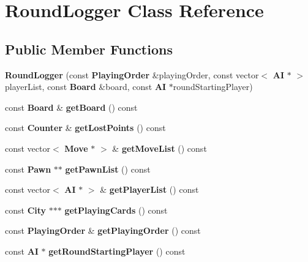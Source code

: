 \section{Round\-Logger Class Reference}
\label{class_round_logger}
\subsection*{Public Member Functions}
\begin{DoxyCompactItemize}
\item 
{\bfseries Round\-Logger} (const {\bf Playing\-Order} \&playing\-Order, const vector$<$ {\bf A\-I} $\ast$ $>$ player\-List, const {\bf Board} \&board, const {\bf A\-I} $\ast$round\-Starting\-Player)\label{class_round_logger_a52c7dc98a3b5ae1f2cc8aae99345b8d0}

\item 
const {\bf Board} \& {\bfseries get\-Board} () const \label{class_round_logger_a08f46631894e71a41826816ef0b0cde0}

\item 
const {\bf Counter} \& {\bfseries get\-Lost\-Points} () const \label{class_round_logger_aaa8b49bb49b3ffa35df429e1b9f6cfa3}

\item 
const vector$<$ {\bf Move} $\ast$ $>$ \& {\bfseries get\-Move\-List} () const \label{class_round_logger_a9abd61dd5ecf5f267ec97305dc313b40}

\item 
const {\bf Pawn} $\ast$$\ast$ {\bfseries get\-Pawn\-List} () const \label{class_round_logger_a2d0b4176229e86c7f7208df3e4e8e0fd}

\item 
const vector$<$ {\bf A\-I} $\ast$ $>$ \& {\bfseries get\-Player\-List} () const \label{class_round_logger_ae772e7fb8c0170c81e3fa6b5b7f28202}

\item 
const {\bf City} $\ast$$\ast$$\ast$ {\bfseries get\-Playing\-Cards} () const \label{class_round_logger_a517bee0efad4e4c75590669bb2857046}

\item 
const {\bf Playing\-Order} \& {\bfseries get\-Playing\-Order} () const \label{class_round_logger_a730043ba9a6d5fb559f4237a77c34ec3}

\item 
const {\bf A\-I} $\ast$ {\bfseries get\-Round\-Starting\-Player} () const \label{class_round_logger_aa8cdd6d2cdd56c9d5ba3281d3f33f5b9}

\end{DoxyCompactItemize}

